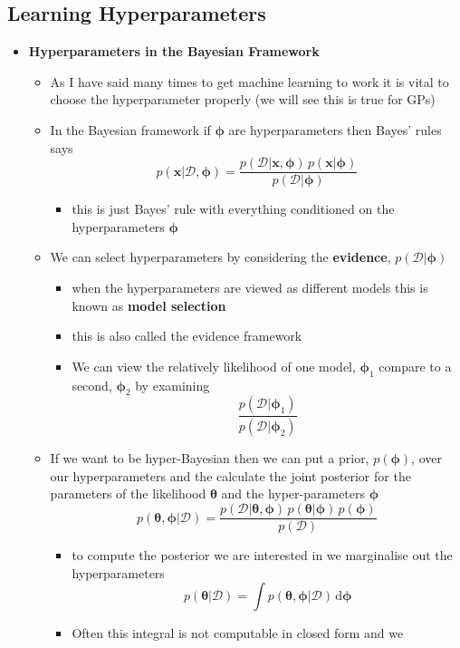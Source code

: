 \documentclass[11pt]{article}
\newcommand{\dd}{\mathrm{d}}
\begin{document}
\subsection{Learning Hyperparameters}
\label{sec:org6fcc66f}
\begin{itemize}
\item \textbf{Hyperparameters in the Bayesian Framework}
\begin{itemize}
\item As I have said many times to get machine learning to work it is
vital to choose the hyperparameter properly (we will see this
is true for GPs)
\item In the Bayesian framework if \(\bm{\phi}\) are hyperparameters
then Bayes' rules says
$$ p(\bm{x}|\mathcal{D},\bm{\phi}) =
       \frac{p(\mathcal{D}|\bm{x},\bm{\phi}) \,
       p(\bm{x}|\bm{\phi})}{p(\mathcal{D}|\bm{\phi}) } $$
\begin{itemize}
\item this is just Bayes' rule with everything conditioned on the
hyperparameters \(\bm{\phi}\)
\end{itemize}
\item We can select hyperparameters by considering the \textbf{evidence},
\(p(\mathcal{D}|\bm{\phi})\)
\begin{itemize}
\item when the hyperparameters are viewed as different models this is
known as \textbf{model selection}
\item this is also called the evidence framework
\item We can view the relatively likelihood of one model,
\(\bm{\phi}_1\) compare to a second, \(\bm{\phi}_2\) by examining
$$ \frac{p(\mathcal{D}|\bm{\phi}_1)}{p(\mathcal{D}|\bm{\phi}_2)} $$
\end{itemize}
\item If we want to be hyper-Bayesian then we can put a prior,
\(p(\bm{\phi})\), over our hyperparameters and the calculate the
joint posterior for the parameters of the likelihood
\(\bm{\theta}\) and the hyper-parameters \(\bm{\phi}\)
$$ p(\bm{\theta},\bm{\phi}| \mathcal{D}) = \frac{p(\mathcal{D}|
       \bm{\theta},\bm{\phi}) \, p(\bm{\theta}|\bm{\phi}) \, p(\bm{\phi})}{
       p(\mathcal{D})} $$
\begin{itemize}
\item to compute the posterior we are interested in we marginalise
out the hyperparameters
$$ p(\bm{\theta}|\mathcal{D}) = \int
         p(\bm{\theta},\bm{\phi}| \mathcal{D}) \,\dd \bm{\phi} $$
\item Often this integral is not computable in closed form and we

\end{itemize}
\end{itemize}
\end{itemize}
\end{document}
